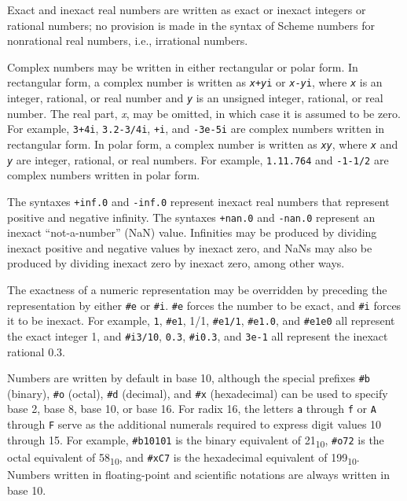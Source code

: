 Exact and inexact real numbers are written as exact or inexact
integers or rational numbers; no provision is made in the syntax
of Scheme numbers for nonrational real numbers, i.e., irrational
numbers.


Complex numbers may be written in either rectangular or polar form.
In rectangular form, a complex number is written as \texttt{\textit{x}+\textit{y}i} or
\texttt{\textit{x}-\textit{y}i},
where \texttt{\textit{x}} is an integer, rational, or real number
and \texttt{\textit{y}} is an unsigned integer, rational, or real number.
The real part, \textit{x}, may be omitted, in which case it is assumed to
be zero.
For example, \texttt{3+4i}, \texttt{3.2-3/4i}, \texttt{+i}, and
\texttt{-3e-5i} are complex numbers written in rectangular form.
In polar form, a complex number is written as \texttt{\textit{x}\@{}\textit{y}},
where \texttt{\textit{x}}
and \texttt{\textit{y}} are integer, rational, or real numbers.
For example, \texttt{1.1\@{}1.764} and \texttt{-1\@{}-1/2} are complex numbers written
in polar form.


The syntaxes \texttt{+inf.0} and \texttt{-inf.0} represent inexact real
numbers that represent positive and negative infinity.
The syntaxes \texttt{+nan.0} and \texttt{-nan.0} represent an inexact
``not-a-number'' (NaN) value.
Infinities may be produced by dividing inexact positive and negative
values by inexact zero, and NaNs may also be produced by dividing inexact
zero by inexact zero, among other ways.


The exactness of a numeric representation may be overridden by
preceding the representation by either \texttt{\#{}e} or \texttt{\#{}i}.
\texttt{\#{}e} forces the number to be exact, and \texttt{\#{}i} forces it to be
inexact.
For example, \texttt{1}, \texttt{\#{}e1}, 1/1, \texttt{\#{}e1/1},
\texttt{\#{}e1.0}, and \texttt{\#{}e1e0} all
represent the exact integer 1, and \texttt{\#{}i3/10},
\texttt{0.3}, \texttt{\#{}i0.3},
and \texttt{3e-1} all represent the inexact rational 0.3.


Numbers are written by default in base 10, although the special prefixes
\label{objects_s78}\texttt{\#{}b} (binary), \label{objects_s79}\texttt{\#{}o} (octal), \label{objects_s80}\texttt{\#{}d} (decimal), and
\label{objects_s81}\texttt{\#{}x} (hexadecimal) can be used to specify base 2, base 8, base 10,
or base 16.
For radix 16, the letters \texttt{a} through \texttt{f}
or \texttt{A} through \texttt{F} serve as the additional numerals required to
express digit values 10 through 15.
For example, \texttt{\#{}b10101} is the binary equivalent of
21\textsubscript{10}, \texttt{\#{}o72} is the octal equivalent of 58\textsubscript{10}, and \texttt{\#{}xC7}
is the hexadecimal equivalent of 199\textsubscript{10}.
Numbers written in floating-point and scientific notations are
always written in base 10.


